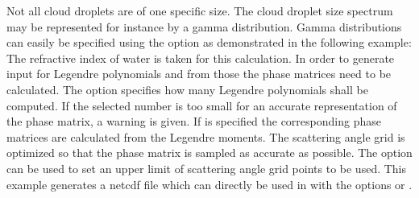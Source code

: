 Not all cloud droplets are of one specific size. The cloud droplet
size spectrum may be represented for instance by a gamma
distribution. Gamma distributions can easily be specified using the
option   as
demonstrated in the following example:
The refractive index of water is taken for this calculation. In order
to generate input for  Legendre polynomials and from
those the phase matrices need to be calculated. The option
 specifies how many Legendre polynomials shall be
computed. If the selected number is too small for an accurate
representation of the phase matrix, a warning is given. If
 is specified the corresponding phase
matrices are calculated from the Legendre moments. The scattering
angle grid is optimized so that the phase matrix is sampled as
accurate as possible. The option  can be used to set
an upper limit of scattering angle grid points to be used. 
This example generates a netcdf file which can directly be used in
 with the options  or
.


